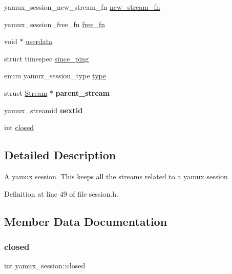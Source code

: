 \begin{DoxyCompactItemize}
yamux\+\_\+session\+\_\+new\+\_\+stream\+\_\+fn \mbox{\hyperlink{structyamux__session_ad7cad2ea5af61eaa97f3cbf36c9537fe}{new\+\_\+stream\+\_\+fn}}
\item 
yamux\+\_\+session\+\_\+free\+\_\+fn \mbox{\hyperlink{structyamux__session_a9db63a1c68be6644105926f64636d849}{free\+\_\+fn}}
\item 
void $\ast$ \mbox{\hyperlink{structyamux__session_a64704789056dc91aa5cd19e2924e5b4e}{userdata}}
\item 
struct timespec \mbox{\hyperlink{structyamux__session_a77a98f103ed7e813fd91c78faa755a5a}{since\+\_\+ping}}
\item 
enum yamux\+\_\+session\+\_\+type \mbox{\hyperlink{structyamux__session_aedf4073b64a4da447135135603cdfeee}{type}}
\item 
\mbox{\label{structyamux__session_aa230bfe37af88acccfb8135a74354cd4}} 
struct \mbox{\hyperlink{struct_stream}{Stream}} $\ast$ {\bfseries parent\+\_\+stream}
\item 
\mbox{\label{structyamux__session_a4827cbd2c729a6cd2c9ddd460ef307c2}} 
yamux\+\_\+streamid {\bfseries nextid}
\item 
int \mbox{\hyperlink{structyamux__session_a3c7ee5ff5854cd25bd01fef3193e307b}{closed}}
\end{DoxyCompactItemize}


\subsection{Detailed Description}
A yamux session. This keeps all the streams related to a yamux session 

Definition at line 49 of file session.\+h.



\subsection{Member Data Documentation}
\mbox{\label{structyamux__session_a3c7ee5ff5854cd25bd01fef3193e307b}} 
\subsubsection{\texorpdfstring{closed}{closed}}
{\footnotesize\ttfamily int yamux\+\_\+session\+::closed}

